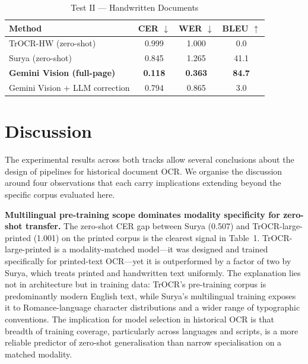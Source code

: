 \documentclass[11pt,a4paper]{article}
\begin{document}
\begin{table}[ht]
\centering
\caption{Test II --- Handwritten Documents}
\label{tab:hw}
\begin{tabular}{lccc}
\toprule
\textbf{Method} & \textbf{CER} $\downarrow$ & \textbf{WER} $\downarrow$ & \textbf{BLEU} $\uparrow$ \\
\midrule
TrOCR-HW (zero-shot)             & 0.999              & 1.000              & 0.0  \\
Surya (zero-shot)                & 0.845              & 1.265              & 41.1 \\
\rowcolor{lightgray}
\textbf{Gemini Vision (full-page)} & \textbf{0.118}   & \textbf{0.363}     & \textbf{84.7} \\
Gemini Vision + LLM correction   & 0.794              & 0.865              & 3.0  \\
\bottomrule
\end{tabular}
\end{table}

\section{Discussion}

The experimental results across both tracks allow several conclusions about the design of
pipelines for historical document OCR. We organise the discussion around four observations
that each carry implications extending beyond the specific corpus evaluated here.

\textbf{Multilingual pre-training scope dominates modality specificity for zero-shot
transfer.} The zero-shot CER gap between Surya (0.507) and TrOCR-large-printed (1.001) on
the printed corpus is the clearest signal in Table~1. TrOCR-large-printed is a modality-matched
model---it was designed and trained specifically for printed-text OCR---yet it is
outperformed by a factor of two by Surya, which treats printed and handwritten text
uniformly. The explanation lies not in architecture but in training data: TrOCR's pre-training
corpus is predominantly modern English text, while Surya's multilingual training exposes it
to Romance-language character distributions and a wider range of typographic conventions.
The implication for model selection in historical OCR is that breadth of training coverage,
particularly across languages and scripts, is a more reliable predictor of zero-shot
generalisation than narrow specialisation on a matched modality.
\end{document}
